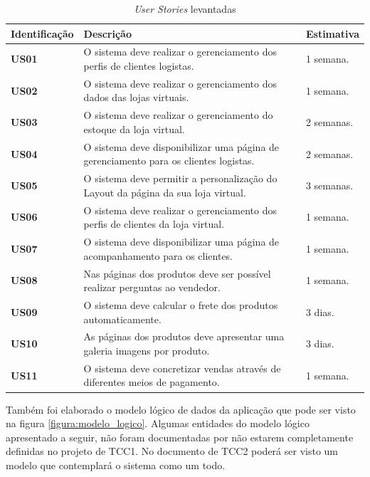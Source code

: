 \documentclass[a4paper,12pt]{monografia}
\begin{document}
\begin{longtable}{|p{3cm}|p{9cm}|p{3cm}|}
\caption{\textit{\textit{User Stories}} levantadas}
\label{quadro:userstories}
\hline
\rowcolor{ballblue}
\textbf{Identificação} & \textbf{Descrição} & \textbf{Estimativa}\\
\hline
\textbf{US01} & O sistema deve realizar o gerenciamento dos perfis de clientes logistas. & 1 semana.\\
\hline
\textbf{US02} & O sistema deve realizar o gerenciamento dos dados das lojas virtuais. & 1 semana.\\
\hline
\textbf{US03} & O sistema deve realizar o gerenciamento do estoque da loja virtual. & 2 semanas.\\
\hline
\textbf{US04} & O sistema deve disponibilizar uma página de gerenciamento para os clientes logistas. & 2 semanas.\\
\hline
\textbf{US05} & O sistema deve permitir a personalização do Layout da página da sua loja virtual. & 3 semanas.\\
\hline
\textbf{US06} & O sistema deve realizar o gerenciamento dos perfis de clientes da loja virtual. & 1 semana.\\
\hline
\textbf{US07} & O sistema deve disponibilizar uma página de acompanhamento para os clientes. & 1 semana.\\
\hline
\textbf{US08} & Nas páginas dos produtos deve ser possível realizar perguntas ao vendedor. & 1 semana.\\
\hline
\textbf{US09} & O sistema deve calcular o frete dos produtos automaticamente. & 3 dias.\\
\hline
\textbf{US10} & As páginas dos produtos deve apresentar uma galeria imagens por produto. & 3 dias.\\
\hline
\textbf{US11} & O sistema deve concretizar vendas através de diferentes meios de pagamento. & 1 semana.\\
\hline
\end{longtable}	

Também foi elaborado o modelo lógico de dados da aplicação que pode ser visto na figura \ref{figura:modelo_logico}. Algumas entidades do modelo lógico apresentado a seguir, não foram documentadas por não estarem completamente definidas no projeto de TCC1. No documento de TCC2 poderá ser visto um modelo que contemplará o sistema como um todo.
\end{document}
